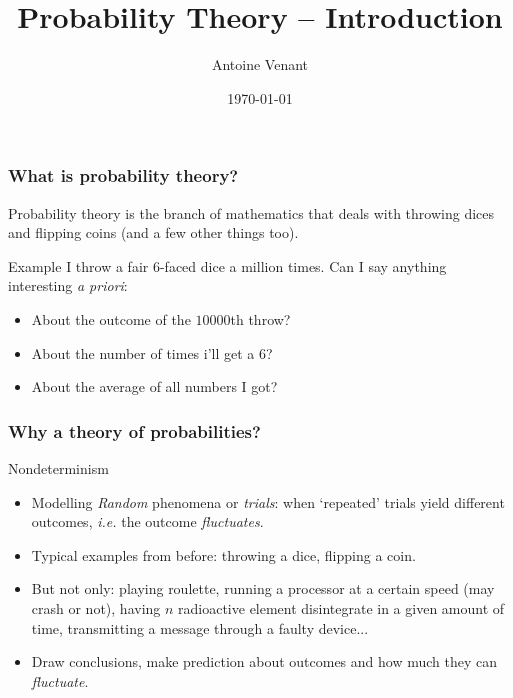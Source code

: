 \documentclass{beamer}
\begin{document}
\title{Probability Theory -- Introduction} 
\author{Antoine Venant}
\date{\today}
\maketitle

\begin{frame}
  \frametitle{What is probability theory?}

  Probability theory is the branch of mathematics that deals with throwing dices and flipping coins (and a few other things too).\\

  \begin{exampleblock}{Example}
    I throw a fair $6$-faced dice a million times. Can I say anything interesting \emph{a priori}:
    \begin{itemize}
    \item About the outcome of the $10000$th throw?
    \item About the number of times i'll get a $6$?
    \item About the average of all numbers I got?
    \end{itemize}
  \end{exampleblock}

  
\end{frame}


\begin{frame}
  \frametitle{Why a theory of probabilities?}
  
  \begin{block}{Nondeterminism}
    \begin{itemize}
    \item Modelling \emph{Random} phenomena or \emph{trials}: when `repeated' trials yield different outcomes, \emph{i.e.} the outcome \emph{fluctuates}.
    \item Typical examples from before: throwing a dice, flipping a coin.
    \item But not only: playing roulette, running a processor at a certain speed (may crash or not), having $n$ radioactive element disintegrate in a given amount of time, transmitting a message through a faulty device...
    \item Draw conclusions, make prediction about outcomes and how much they can \emph{fluctuate}.
    \end{itemize}
  \end{block}  
\end{frame}
\end{document}
